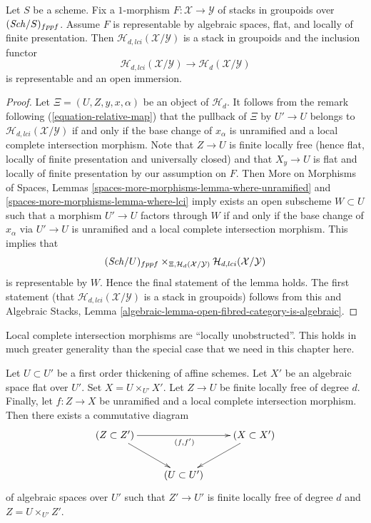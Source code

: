 \begin{lemma}
\label{lemma-lci-locus-stack-in-groupoids}
Let $S$ be a scheme. Fix a $1$-morphism
$F : \mathcal{X} \longrightarrow \mathcal{Y}$
of stacks in groupoids over $(\mathit{Sch}/S)_{fppf}$.
Assume $F$ is representable by algebraic spaces, flat, and locally
of finite presentation. Then $\mathcal{H}_{d, lci}(\mathcal{X}/\mathcal{Y})$
is a stack in groupoids and the inclusion functor
$$
\mathcal{H}_{d, lci}(\mathcal{X}/\mathcal{Y})
\longrightarrow
\mathcal{H}_d(\mathcal{X}/\mathcal{Y})
$$
is representable and an open immersion.
\end{lemma}

\begin{proof}
Let $\Xi = (U, Z, y, x, \alpha)$ be an object of $\mathcal{H}_d$. It follows
from the remark following
(\ref{equation-relative-map})
that the pullback of $\Xi$ by $U' \to U$ belongs to
$\mathcal{H}_{d, lci}(\mathcal{X}/\mathcal{Y})$ if and only if the base
change of $x_\alpha$ is unramified and a local complete intersection morphism.
Note that $Z \to U$ is finite locally free (hence flat, locally of
finite presentation and universally closed) and that $X_y \to U$ is
flat and locally of finite presentation by our assumption on $F$. Then
More on Morphisms of Spaces, Lemmas
\ref{spaces-more-morphisms-lemma-where-unramified} and
\ref{spaces-more-morphisms-lemma-where-lci}
imply exists an open subscheme $W \subset U$ such that a morphism
$U' \to U$ factors through $W$ if and only if the base change of
$x_\alpha$ via $U' \to U$ is unramified and a local complete intersection
morphism. This implies that
$$
(\mathit{Sch}/U)_{fppf}
\times_{\Xi, \mathcal{H}_d(\mathcal{X}/\mathcal{Y})}
\mathcal{H}_{d, lci}(\mathcal{X}/\mathcal{Y})
$$
is representable by $W$. Hence the final statement of the lemma
holds. The first statement (that
$\mathcal{H}_{d, lci}(\mathcal{X}/\mathcal{Y})$ is a stack in groupoids)
follows from this and
Algebraic Stacks,
Lemma \ref{algebraic-lemma-open-fibred-category-is-algebraic}.
\end{proof}

\noindent
Local complete intersection morphisms are ``locally unobstructed''.
This holds in much greater generality than the special case
that we need in this chapter here.

\begin{lemma}
\label{lemma-lci-unobstructed}
Let $U \subset U'$ be a first order thickening of affine schemes.
Let $X'$ be an algebraic space flat over $U'$. Set $X = U \times_{U'} X'$.
Let $Z \to U$ be finite locally free of degree $d$. Finally, let
$f : Z \to X$ be unramified and a local complete intersection morphism.
Then there exists a commutative diagram
$$
\xymatrix{
(Z \subset Z') \ar[rd] \ar[rr]_{(f, f')} & & (X \subset X') \ar[ld] \\
& (U \subset U')
}
$$
of algebraic spaces over $U'$ such that $Z' \to U'$ is finite locally free
of degree $d$ and $Z = U \times_{U'} Z'$.
\end{lemma}

